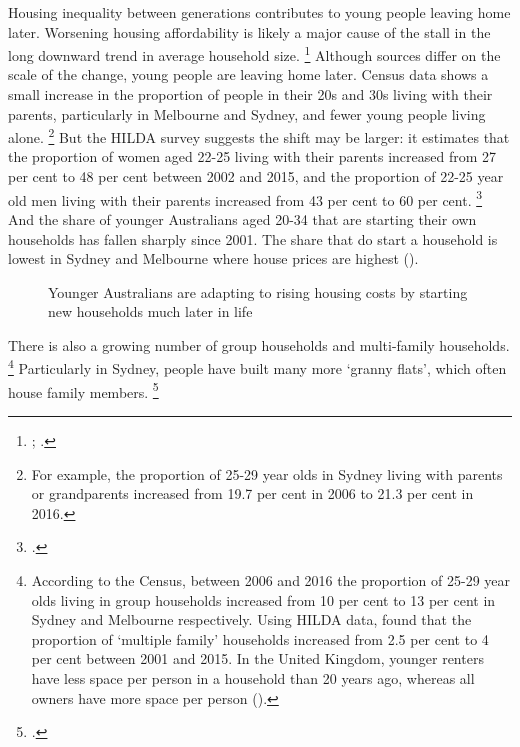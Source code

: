 Housing inequality between generations contributes to young people leaving home later.
Worsening housing affordability is likely a major cause of the stall in the long downward trend in average household size.%
	\footnote{\textcites{Eslake2013}[][24]{McDonaldTemple-2013-Projs-Housing-demand-Aust}; .}
Although sources differ on the scale of the change, young people are leaving home later. 
Census data shows a small increase in the proportion of people in their 20s and 30s living with their parents, particularly in Melbourne and Sydney, and fewer young people living alone.%
    \footnote{For example, the proportion of 25-29 year olds in Sydney living with parents or grandparents increased from 19.7 per cent in 2006 to 21.3 per cent in 2016.}
But the HILDA survey suggests the shift may be larger: it estimates that the proportion of women aged 22-25 living with their parents increased from 27 per cent to 48 per cent between 2002 and 2015, and the proportion of 22-25 year old men living with their parents increased from 43 per cent to 60 per cent.%
	\footcite[][Figure~2.1]{Wilkins2017-HILDA-Selected-findings}
And the share of younger Australians aged 20-34 that are starting their own households has fallen sharply since 2001. The share that do start a household is lowest in Sydney and Melbourne where house prices are highest ().


\begin{figure}
\caption{Younger Australians are adapting to rising housing costs by starting new households much later in life}\label{fig:headsip-ratio}
{\textcite{Gradwell2017HousingBalance}}
\end{figure}

 


There is also a growing number of group households and multi-family households.%
	\footnote{According to the Census, between 2006 and 2016 the proportion of 25-29 year olds living in group households increased from 10 per cent to 13 per cent in Sydney and Melbourne respectively. Using HILDA data, \textcite[][6]{Wilkins2017-HILDA-Selected-findings} found that the proportion of `multiple family' households increased from 2.5 per cent to 4 per cent between 2001 and 2015. In the United Kingdom, younger renters have less space per person in a household than 20 years ago, whereas all owners have more space per person (\textcite{Corlett-Judge-2017-Housing-across-gens}).}
Particularly in Sydney, people have built many more `granny flats', which often house family members.%
	\footcites[][21]{Thomas-2016-Housing-supply-outcomes-from-Sydney-codification}{FuaryWagner-2015-Domain-Sydney-in-midst-of-grannyflat-boom}

